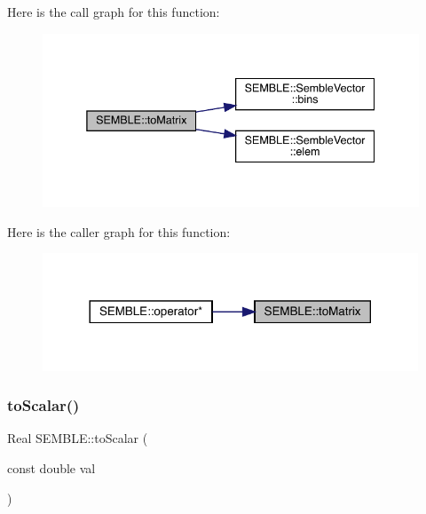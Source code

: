 Here is the call graph for this function\+:
\nopagebreak
\begin{figure}[H]
\begin{center}
\leavevmode
\includegraphics[width=338pt]{d7/dfd/namespaceSEMBLE_aea4587cae7fab8901bd83a04f0b263be_cgraph}
\end{center}
\end{figure}
Here is the caller graph for this function\+:
\nopagebreak
\begin{figure}[H]
\begin{center}
\leavevmode
\includegraphics[width=317pt]{d7/dfd/namespaceSEMBLE_aea4587cae7fab8901bd83a04f0b263be_icgraph}
\end{center}
\end{figure}
\mbox{\label{namespaceSEMBLE_a1f42facef04bfb2c3d89c7a76b9c17d2}} 
\subsubsection{\texorpdfstring{toScalar()}{toScalar()}\hspace{0.1cm}{\footnotesize\ttfamily [1/6]}}
{\footnotesize\ttfamily Real S\+E\+M\+B\+L\+E\+::to\+Scalar (\begin{DoxyParamCaption}\item[{const double}]{val }\end{DoxyParamCaption})\hspace{0.3cm}{\ttfamily [inline]}}

